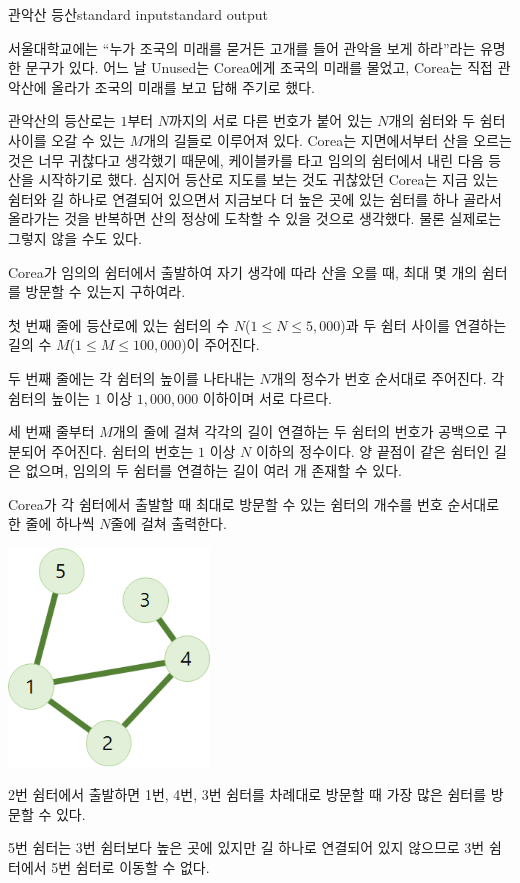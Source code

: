 \begin{problem}{관악산 등산}{standard input}{standard output}

서울대학교에는 ``누가 조국의 미래를 묻거든 고개를 들어 관악을 보게 하라''라는 유명한 문구가 있다. 어느 날 Unused는 Corea에게 조국의 미래를 물었고, Corea는 직접 관악산에 올라가 조국의 미래를 보고 답해 주기로 했다.

관악산의 등산로는 $1$부터 $N$까지의 서로 다른 번호가 붙어 있는 $N$개의 쉼터와 두 쉼터 사이를 오갈 수 있는 $M$개의 길들로 이루어져 있다. Corea는 지면에서부터 산을 오르는 것은 너무 귀찮다고 생각했기 때문에, 케이블카를 타고 임의의 쉼터에서 내린 다음 등산을 시작하기로 했다. 심지어 등산로 지도를 보는 것도 귀찮았던 Corea는 지금 있는 쉼터와 길 하나로 연결되어 있으면서 지금보다 더 높은 곳에 있는 쉼터를 하나 골라서 올라가는 것을 반복하면 산의 정상에 도착할 수 있을 것으로 생각했다. 물론 실제로는 그렇지 않을 수도 있다.

Corea가 임의의 쉼터에서 출발하여 자기 생각에 따라 산을 오를 때, 최대 몇 개의 쉼터를 방문할 수 있는지 구하여라.

\InputFile
첫 번째 줄에 등산로에 있는 쉼터의 수 $N$($1 \le N \le 5,000$)과 두 쉼터 사이를 연결하는 길의 수 $M$($1 \le M \le 100,000$)이 주어진다.

두 번째 줄에는 각 쉼터의 높이를 나타내는 $N$개의 정수가 번호 순서대로 주어진다. 각 쉼터의 높이는 $1$ 이상 $1,000,000$ 이하이며 서로 다르다.

세 번째 줄부터 $M$개의 줄에 걸쳐 각각의 길이 연결하는 두 쉼터의 번호가 공백으로 구분되어 주어진다. 쉼터의 번호는 $1$ 이상 $N$ 이하의 정수이다. 양 끝점이 같은 쉼터인 길은 없으며, 임의의 두 쉼터를 연결하는 길이 여러 개 존재할 수 있다.

\OutputFile
Corea가 각 쉼터에서 출발할 때 최대로 방문할 수 있는 쉼터의 개수를 번호 순서대로 한 줄에 하나씩 $N$줄에 걸쳐 출력한다.

\Example

\begin{example}
%
\end{example}

\Notes
\begin{center}
  \includegraphics[width=0.4\textwidth]{climb.png}
\end{center}

2번 쉼터에서 출발하면 1번, 4번, 3번 쉼터를 차례대로 방문할 때 가장 많은 쉼터를 방문할 수 있다.

5번 쉼터는 3번 쉼터보다 높은 곳에 있지만 길 하나로 연결되어 있지 않으므로 3번 쉼터에서 5번 쉼터로 이동할 수 없다.

\end{problem}
